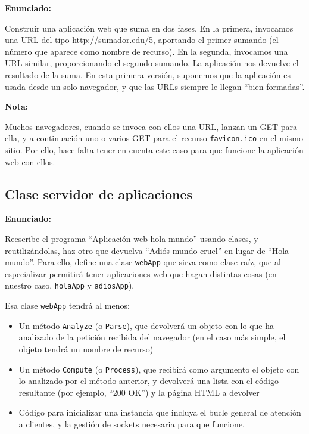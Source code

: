 \textbf{Enunciado:}

Construir una aplicación web que suma en dos fases. En la primera, invocamos una URL del tipo \url{http://sumador.edu/5}, aportando el primer sumando (el número que aparece como nombre de recurso). En la segunda, invocamos una URL similar, proporcionando el segundo sumando. La aplicación nos devuelve el resultado de la suma. En esta primera versión, suponemos que la aplicación es usada desde un solo navegador, y que las URLs siempre le llegan ``bien formadas''.

\textbf{Nota:}

Muchos navegadores, cuando se invoca con ellos una URL, lanzan un GET para ella, y a continuación uno o varios GET para el recurso \texttt{favicon.ico} en el mismo sitio. Por ello, hace falta tener en cuenta este caso para que funcione la aplicación web con ellos.

\subsection{Clase servidor de aplicaciones}
\label{subsec:clase-serv-aplis}

\textbf{Enunciado:}

Reescribe el programa ``Aplicación web hola mundo'' usando clases, y reutilizándolas, haz otro que devuelva ``Adiós mundo cruel'' en lugar de ``Hola mundo''. Para ello, define una clase \texttt{webApp} que sirva como clase raíz, que al especializar permitirá tener aplicaciones web que hagan distintas cosas (en nuestro caso, \texttt{holaApp} y \texttt{adiosApp}).

Esa clase \texttt{webApp} tendrá al menos:

\begin{itemize}
\item Un método \texttt{Analyze} (o \texttt{Parse}), que devolverá un objeto con lo que ha analizado de la petición recibida del navegador (en el caso más simple, el objeto tendrá un nombre de recurso)
\item Un método \texttt{Compute} (o \texttt{Process}), que recibirá como argumento el objeto con lo analizado por el método anterior, y devolverá una lista con el código resultante (por ejemplo, ``200 OK'') y la página HTML a devolver
\item Código para inicializar una instancia que incluya el bucle general de atención a clientes, y la gestión de sockets necesaria para que funcione.
\end{itemize}

